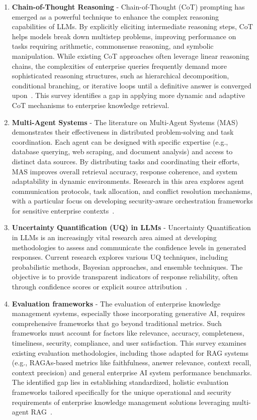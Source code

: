 \documentclass[default]{sn-jnl}%
\begin{document}
\begin{enumerate}
    \item \textbf{Chain-of-Thought Reasoning} - Chain-of-Thought (CoT) prompting has emerged as a powerful technique to enhance the complex reasoning capabilities of LLMs. By explicitly eliciting intermediate reasoning steps, CoT helps models break down multistep problems, improving performance on tasks requiring arithmetic, commonsense reasoning, and symbolic manipulation. While existing CoT approaches often leverage linear reasoning chains, the complexities of enterprise queries frequently demand more sophisticated reasoning structures, such as hierarchical decomposition, conditional branching, or iterative loops until a definitive answer is converged upon~\cite{ref7}. This survey identifies a gap in applying more dynamic and adaptive CoT mechanisms to enterprise knowledge retrieval.
    \item \textbf{Multi-Agent Systems} - The literature on Multi-Agent Systems (MAS) demonstrates their effectiveness in distributed problem-solving and task coordination. Each agent can be designed with specific expertise (e.g., database querying, web scraping, and document analysis) and access to distinct data sources. By distributing tasks and coordinating their efforts, MAS improves overall retrieval accuracy, response coherence, and system adaptability in dynamic environments. Research in this area explores agent communication protocols, task allocation, and conflict resolution mechanisms, with a particular focus on developing security-aware orchestration frameworks for sensitive enterprise contexts~\cite{ref8}.
    \item \textbf{Uncertainty Quantification (UQ) in LLMs} - Uncertainty Quantification in LLMs is an increasingly vital research area aimed at developing methodologies to assess and communicate the confidence levels in generated responses. Current research explores various UQ techniques, including probabilistic methods, Bayesian approaches, and ensemble techniques. The objective is to provide transparent indicators of response reliability, often through confidence scores or explicit source attribution~\cite{ref9}.
    \item \textbf{Evaluation frameworks} - The evaluation of enterprise knowledge management systems, especially those incorporating generative AI, requires comprehensive frameworks that go beyond traditional metrics. Such frameworks must account for factors like relevance, accuracy, completeness, timeliness, security, compliance, and user satisfaction. This survey examines existing evaluation methodologies, including those adapted for RAG systems (e.g., RAGAs-based metrics like faithfulness, answer relevance, context recall, context precision) and general enterprise AI system performance benchmarks. The identified gap lies in establishing standardized, holistic evaluation frameworks tailored specifically for the unique operational and security requirements of enterprise knowledge management solutions leveraging multi-agent RAG~\cite{ref10}.
\end{enumerate}
\end{document}
